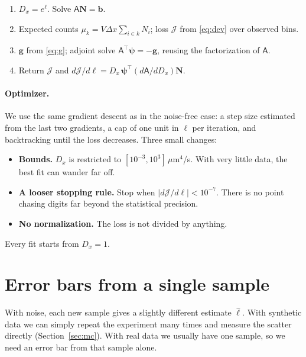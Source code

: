 \documentclass[11pt]{article}
\newcommand{\um}{\,\mu\mathrm{m}}
\newcommand{\J}{\mathcal{J}}
\newcommand{\A}{\mathsf{A}}
\newcommand{\N}{\mathbf{N}}
\newcommand{\bpsi}{\bm{\psi}}
\begin{document}
\begin{tcolorbox}[mybox,title={\textbf{Loss and gradient for noisy counts}}]
\begin{enumerate}[leftmargin=*,label=\arabic*.]
\item $D_x = e^\ell$. Solve $\A\N = \mathbf{b}$.
\item Expected counts $\mu_k = V\Delta x\sum_{i\in k}N_i$; loss $\J$ from \eqref{eq:dev} over observed bins.
\item $\mathbf{g}$ from \eqref{eq:g}; adjoint solve $\A^\top\bpsi = -\mathbf{g}$, reusing the factorization of $\A$.
\item Return $\J$ and $d\J/d\ell = D_x\,\bpsi^\top(d\A/dD_x)\N$.
\end{enumerate}
\end{tcolorbox}

\paragraph{Optimizer.} We use the same gradient descent as in the noise-free case: a step size estimated from the last two gradients, a cap of one unit in $\ell$ per iteration, and backtracking until the loss decreases. Three small changes:
\begin{itemize}
\item \textbf{Bounds.} $D_x$ is restricted to $[10^{-3}, 10^{3}]\um^4$/s. With very little data, the best fit can wander far off.
\item \textbf{A looser stopping rule.} Stop when $|d\J/d\ell| < 10^{-7}$. There is no point chasing digits far beyond the statistical precision.
\item \textbf{No normalization.} The loss is not divided by anything.
\end{itemize}
Every fit starts from $D_x = 1$.

\section{Error bars from a single sample}\label{sec:errorbar}
With noise, each new sample gives a slightly different estimate $\hat\ell$. With synthetic data we can simply repeat the experiment many times and measure the scatter directly (Section~\ref{sec:mc}). With real data we usually have one sample, so we need an error bar from that sample alone.
\end{document}
